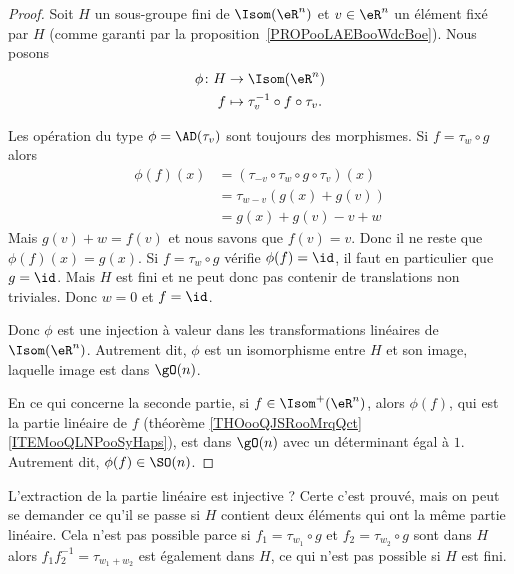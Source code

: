 \begin{proof}
	Soit \( H\) un sous-groupe fini de \( \Isom(\eR^n)\) et \( v\in \eR^n\) un élément fixé par \( H\) (comme garanti par la proposition~\ref{PROPooLAEBooWdcBoe}). Nous posons
	\begin{equation}
		\begin{aligned}
			\phi\colon H & \to \Isom(\eR^n)                        \\
			f            & \mapsto \tau_v^{-1}\circ f\circ \tau_v.
		\end{aligned}
	\end{equation}

	\begin{subproof}
		Les opération du type \( \phi=\AD(\tau_v)\) sont toujours des morphismes.
		Si \( f=\tau_w\circ g\) alors
		\begin{subequations}
			\begin{align}
				\phi(f)(x) & =(\tau_{-v}\circ\tau_w\circ g\circ\tau_v)(x) \\
				           & =\tau_{w-v}(   g(x)+g(v)  )                  \\
				           & =g(x)+g(v)-v+w
			\end{align}
		\end{subequations}
		Mais \( g(v)+w=f(v)\) et nous savons que \( f(v)=v\). Donc il ne reste que \( \phi(f)(x)=g(x)\).
		Si \( f=\tau_w\circ g\) vérifie \( \phi(f)=\id\), il faut en particulier que \( g=\id\). Mais \( H\) est fini et ne peut donc pas contenir de translations non triviales. Donc \( w=0\) et \( f=\id\).
	\end{subproof}
	Donc \( \phi\) est une injection à valeur dans les transformations linéaires de \( \Isom(\eR^n)\). Autrement dit, \( \phi\) est un isomorphisme entre \( H\) et son image, laquelle image est dans \( \gO(n)\).

	En ce qui concerne la seconde partie, si \( f\in\Isom^+(\eR^n)\), alors \( \phi(f)\), qui est la partie linéaire de \( f\) (théorème \ref{THOooQJSRooMrqQct}\ref{ITEMooQLNPooSyHaps}), est dans \( \gO(n)\) avec un déterminant égal à \( 1\). Autrement dit, \( \phi(f)\in\SO(n)\).
\end{proof}

L'extraction de la partie linéaire est injective ? Certe c'est prouvé, mais on peut se demander ce qu'il se passe si \( H\) contient deux éléments qui ont la même partie linéaire. Cela n'est pas possible parce si \( f_1=\tau_{w_1}\circ g\) et \( f_2=\tau_{w_2}\circ g\) sont dans \( H\) alors \( f_1f_2^{-1}=\tau_{w_1+w_2}\) est également dans \( H\), ce qui n'est pas possible si \( H\) est fini.

